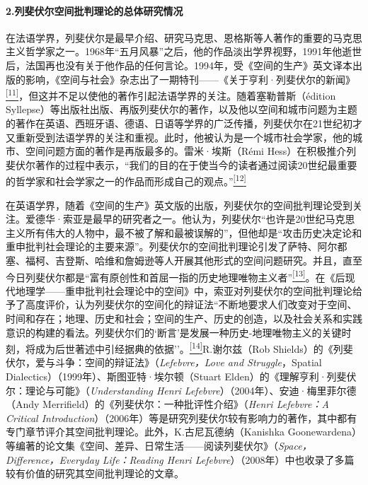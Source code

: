 \documentclass[UTF8, fontset = sourcesans, a4paper, oneside, zihao =
-4, scheme=chinese, no-math, space=true]{ctexbook}
\begin{document}
\paragraph{2.列斐伏尔空间批判理论的总体研究情况}\label{part0004.htmlux5cux23e004}

在法语学界，列斐伏尔是最早介绍、研究马克思、恩格斯等人著作的重要的马克思主义哲学家之一。1968年``五月风暴''之后，他的作品淡出学界视野，1991年他逝世后，法国再也没有关于他作品的任何言论。1994年，受《空间的生产》英文译本出版的影响，《空间与社会》杂志出了一期特刊------《关于亨利·列斐伏尔的新闻》\protect\hypertarget{part0004.htmlux5cux23w11}{}{}\protect\hyperlink{part0004.htmlux5cux23m11}{\textsuperscript{{[}11{]}}}，但这并不足以使他的著作引起法语学界的关注。随着塞勒普斯（édition
Syllepse）等出版社出版、再版列斐伏尔的著作，以及他以空间和城市问题为主题的著作在英语、西班牙语、德语、日语等学界的广泛传播，列斐伏尔在21世纪初才又重新受到法语学界的关注和重视。此时，他被认为是一个城市社会学家，他的城市、空间问题方面的著作是再版最多的。雷米·埃斯（Rémi
Hess）在积极推介列斐伏尔著作的过程中表示，``我们的目的在于使当今的读者通过阅读20世纪最重要的哲学家和社会学家之一的作品而形成自己的观点。''\protect\hypertarget{part0004.htmlux5cux23w12}{}{}\protect\hyperlink{part0004.htmlux5cux23m12}{\textsuperscript{{[}12{]}}}

在英语学界，随着《空间的生产》英文版的出版，列斐伏尔的空间批判理论受到关注。爱德华·索亚是最早的研究者之一。他认为，列斐伏尔``也许是20世纪马克思主义所有伟大的人物中，最不被了解和最被误解的''，但他却是``攻击历史决定论和重申批判社会理论的主要来源''。列斐伏尔的空间批判理论引发了萨特、阿尔都塞、福柯、吉登斯、哈维和詹姆逊等人开展其他形式的空间问题研究。并且，直至今日列斐伏尔都是``富有原创性和首屈一指的历史地理唯物主义者''\protect\hypertarget{part0004.htmlux5cux23w13}{}{}\protect\hyperlink{part0004.htmlux5cux23m13}{\textsuperscript{{[}13{]}}}。在《后现代地理学------重申批判社会理论中的空间》中，索亚对列斐伏尔的空间批判理论给予了高度评价，认为列斐伏尔的空间化的辩证法``不断地要求人们改变对于空间、时间和存在；地理、历史和社会；空间的生产、历史的创造，以及社会关系和实践意识的构建的看法。列斐伏尔们的`断言'是发展一种历史-地理唯物主义的关键时刻，将成为后世著述中引经据典的依据''。\protect\hypertarget{part0004.htmlux5cux23w14}{}{}\protect\hyperlink{part0004.htmlux5cux23m14}{\textsuperscript{{[}14{]}}}R.谢尔兹（Rob
Shields）的《列斐伏尔，爱与斗争：空间的辩证法》（\emph{Lefebvre，Love
and Struggle}，Spatial Dialectics）（1999年）、斯图亚特·埃尔顿（Stuart
Elden）的《理解亨利·列斐伏尔：理论与可能》（\emph{Understanding Henri
Lefebvre}）（2004年）、安迪·梅里菲尔德（Andy
Merrifield）的《列斐伏尔：一种批评性介绍》（\emph{Henri Lefebvre：A
Critical
Introduction}）（2006年）等是研究列斐伏尔较有影响力的著作，其中都有专门章节评介其空间批判理论。此外，K.古尼瓦德纳（Kanishka
Goonewardena）等编著的论文集《空间、差异、日常生活------阅读列斐伏尔》（\emph{Space，Difference，Everyday
Life：Reading Henri
Lefebvre}）（2008年）中也收录了多篇较有价值的研究其空间批判理论的文章。
\end{document}
